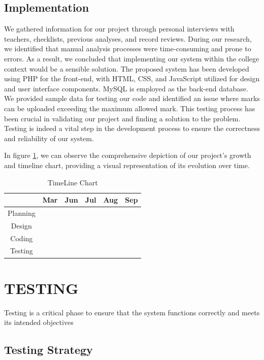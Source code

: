 \documentclass{nascproject}
\begin{document}
\section{Implementation}
	We gathered information for our project through personal interviews with teachers, checklists, previous analyses, and record reviews. During our research, we identified that manual analysis processes were time-consuming and prone to errors. As a result, we concluded that implementing our system within the college context would be a sensible solution. 
The proposed system has been developed using PHP for the front-end, with HTML, CSS, and JavaScript utilized for design and user interface components. MySQL is employed as the back-end database. We provided sample data for testing our code and identified an issue where marks can be uploaded exceeding the maximum allowed mark. This testing process has been crucial in validating our project and finding a solution to the problem. Testing is indeed a vital step in the development process to ensure the correctness and reliability of our system.

	In figure \ref{timeline}, we can observe the comprehensive depiction of our project's growth and timeline chart, providing a visual representation of its evolution over time. 
	


	\begin{table}[h]
		\centering
		\begin{tabular}{|c|c|c|c|c|c|}
			\hline
			& Mar & Jun & Jul & Aug & Sep \\
			\hline
			Planning & \cellcolor{gray!30} & \cellcolor{gray!30} & & &  \\
			\cline{1-2}
			Design & & \cellcolor{gray!30} & \cellcolor{gray!30} & &  \\
			\cline{1-4}
			Coding & & & & \cellcolor{gray!30} & \cellcolor{gray!30}  \\
			\cline{1-6}
			Testing & & & & & \cellcolor{gray!30}  \\
			
		
		\end{tabular}
	\caption{TimeLine Chart}
	\label{timeline}
	\end{table}

\chapter{TESTING}
Testing is a critical phase to ensure that the system functions correctly and meets its intended objectives
\section{Testing Strategy}
\end{document}
